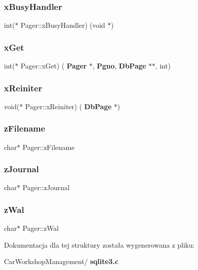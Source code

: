 \subsubsection{xBusyHandler}
{\footnotesize\ttfamily int($\ast$ Pager\+::x\+Busy\+Handler) (void $\ast$)}

\mbox{\label{struct_pager_aa9ce69144089e7a64d7e493a56ca39bb}} 
\subsubsection{xGet}
{\footnotesize\ttfamily int($\ast$ Pager\+::x\+Get) (\textbf{ Pager} $\ast$, \textbf{ Pgno}, \textbf{ Db\+Page} $\ast$$\ast$, int)}

\mbox{\label{struct_pager_ad214904b953afe7d4718a713fedb8c98}} 
\subsubsection{xReiniter}
{\footnotesize\ttfamily void($\ast$ Pager\+::x\+Reiniter) (\textbf{ Db\+Page} $\ast$)}

\mbox{\label{struct_pager_a2a55a044468f8658b7993e57087a5561}} 
\subsubsection{zFilename}
{\footnotesize\ttfamily char$\ast$ Pager\+::z\+Filename}

\mbox{\label{struct_pager_ab36ce1f606c407ad3fc56a3651f5a319}} 
\subsubsection{zJournal}
{\footnotesize\ttfamily char$\ast$ Pager\+::z\+Journal}

\mbox{\label{struct_pager_ac63ab281e48f9ac8521b85c1a90475b3}} 
\subsubsection{zWal}
{\footnotesize\ttfamily char$\ast$ Pager\+::z\+Wal}



Dokumentacja dla tej struktury została wygenerowana z pliku\+:\begin{DoxyCompactItemize}
\item 
Car\+Workshop\+Management/\textbf{ sqlite3.\+c}\end{DoxyCompactItemize}
